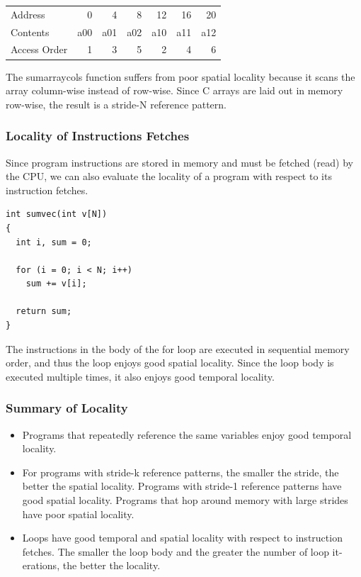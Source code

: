\documentclass[11pt]{article}
\begin{document}
\begin{center}
\begin{tabular}{lrrrrrr}
Address & 0 & 4 & 8 & 12 & 16 & 20\\
Contents & a00 & a01 & a02 & a10 & a11 & a12\\
Access Order & 1 & 3 & 5 & 2 & 4 & 6\\
\end{tabular}
\end{center}

The sumarraycols function suffers from poor spatial locality because it scans the array column-wise instead of row-wise. Since C arrays are laid out in memory row-wise, the result is a stride-N reference pattern.\\


\subsubsection{Locality of Instructions Fetches}
\label{sec:org54397d5}
Since program instructions are stored in memory and must be fetched (read) by the CPU, we can also evaluate the locality of a program with respect to its instruction fetches.\\

\begin{verbatim}
int sumvec(int v[N])
{
  int i, sum = 0;

  for (i = 0; i < N; i++)
    sum += v[i];

  return sum;
}

\end{verbatim}
The instructions in the body of the for loop are executed in sequential memory order, and thus the loop enjoys good spatial locality. Since the loop body is executed multiple times, it also enjoys good temporal locality.\\


\subsubsection{Summary of Locality}
\label{sec:org8510a30}
\begin{itemize}
\item Programs that repeatedly reference the same variables enjoy good temporal locality.\\
\item For programs with stride-k reference patterns, the smaller the stride, the better the spatial locality. Programs with stride-1 reference patterns have good spatial locality. Programs that hop around memory with large strides have poor spatial locality.\\
\item Loops have good temporal and spatial locality with respect to instruction fetches. The smaller the loop body and the greater the number of loop it- erations, the better the locality.\\
\end{itemize}
\end{document}
